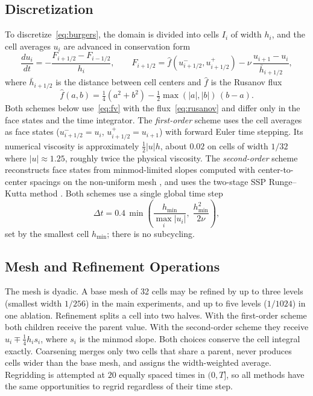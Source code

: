 \documentclass[conference]{IEEEtran}
\begin{document}
\subsection{Discretization}

To discretize~\eqref{eq:burgers}, the domain is divided into cells $I_i$ of width $h_i$, and the cell averages $u_i$ are advanced in conservation form
\begin{equation}
\frac{du_i}{dt} = -\frac{F_{i+1/2} - F_{i-1/2}}{h_i}, \qquad
F_{i+1/2} = \hat f\!\left(u^-_{i+1/2}, u^+_{i+1/2}\right) - \nu\,\frac{u_{i+1}-u_i}{\bar h_{i+1/2}},
\label{eq:fv}
\end{equation}
where $\bar h_{i+1/2}$ is the distance between cell centers and $\hat f$ is the Rusanov flux
\begin{equation}
\hat f(a,b) = \tfrac{1}{4}\left(a^2 + b^2\right) - \tfrac{1}{2}\max(|a|,|b|)\,(b - a).
\label{eq:rusanov}
\end{equation}
Both schemes below use~\eqref{eq:fv} with the flux~\eqref{eq:rusanov} and differ only in the face states and the time integrator. The \emph{first-order} scheme uses the cell averages as face states ($u^-_{i+1/2} = u_i$, $u^+_{i+1/2} = u_{i+1}$) with forward Euler time stepping. Its numerical viscosity is approximately $\tfrac{1}{2}|u|h$, about $0.02$ on cells of width $1/32$ where $|u| \approx 1.25$, roughly twice the physical viscosity. The \emph{second-order} scheme reconstructs face states from minmod-limited slopes computed with center-to-center spacings on the non-uniform mesh \cite{vanleer1979}, and uses the two-stage SSP Runge--Kutta method \cite{gottlieb2001}. Both schemes use a single global time step
\begin{equation}
\Delta t = 0.4\,\min\!\left(\frac{h_{\min}}{\max_i |u_i|},\; \frac{h_{\min}^2}{2\nu}\right),
\label{eq:dt}
\end{equation}
set by the smallest cell $h_{\min}$; there is no subcycling.

\subsection{Mesh and Refinement Operations}

The mesh is dyadic. A base mesh of 32 cells may be refined by up to three levels (smallest width $1/256$) in the main experiments, and up to five levels ($1/1024$) in one ablation. Refinement splits a cell into two halves. With the first-order scheme both children receive the parent value. With the second-order scheme they receive $u_i \mp \tfrac{1}{4} h_i s_i$, where $s_i$ is the minmod slope. Both choices conserve the cell integral exactly. Coarsening merges only two cells that share a parent, never produces cells wider than the base mesh, and assigns the width-weighted average. Regridding is attempted at $20$ equally spaced times in $(0, T]$, so all methods have the same opportunities to regrid regardless of their time step.
\end{document}
